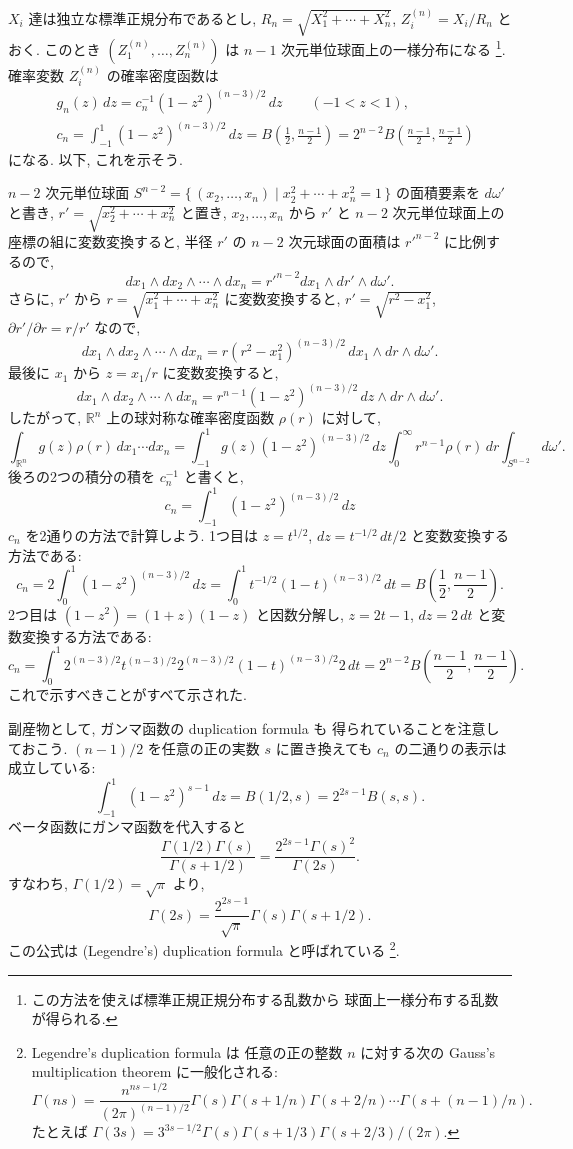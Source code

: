 \documentclass[12pt,twoside]{jarticle}
\newcommand\R{{\mathbb R}} %
\renewcommand\d{\partial}
\theoremstyle{jplain}
\theoremstyle{jplain}
\theoremstyle{jplain}
\numberwithin{theorem}{section}
\numberwithin{equation}{section}
\numberwithin{figure}{section}
\numberwithin{table}{section}
\begin{document}
$X_i$ 達は独立な標準正規分布であるとし, $R_n=\sqrt{X_1^2+\cdots+X_n^2}$,
$Z^{(n)}_i=X_i/R_n$ とおく. 
このとき $(Z^{(n)}_1,\ldots,Z^{(n)}_n)$ は $n-1$ 次元単位球面上の一様分布になる%
\footnote{この方法を使えば標準正規正規分布する乱数から
球面上一様分布する乱数が得られる.}.
確率変数 $Z^{(n)}_i$ の確率密度函数は
\begin{align*}
&
g_n(z)\,dz = c_n^{-1} (1-z^2)^{(n-3)/2}\,dz \qquad (-1<z<1),
\\ &
c_n
= \int_{-1}^1 (1-z^2)^{(n-3)/2}\,dz
= B\left( \frac{1}{2},\frac{n-1}{2} \right)
= 2^{n-2} B\left(\frac{n-1}{2},\frac{n-1}{2}\right)
\end{align*}
になる. 以下, これを示そう.

$n-2$ 次元単位球面 $S^{n-2}=\{\,(x_2,\ldots,x_n)\mid x_2^2+\cdots+x_n^2=1\,\}$ 
の面積要素を $d\omega'$ と書き, 
$r'=\sqrt{x_2^2+\cdots+x_n^2}$ と置き, 
$x_2,\ldots,x_n$ から $r'$ と $n-2$ 次元単位球面上の座標の組に変数変換すると, 
半径 $r'$ の $n-2$ 次元球面の面積は $r'^{n-2}$ に比例するので, 
\[
dx_1\wedge dx_2\wedge\cdots\wedge dx_n
=r'^{n-2}dx_1\wedge dr'\wedge d\omega'.
\]
さらに, $r'$ から $r=\sqrt{x_1^2+\cdots+x_n^2}$ に変数変換すると, 
$r'=\sqrt{r^2-x_1^2}$, $\d r'/\d r=r/r'$ なので, 
\[
dx_1\wedge dx_2\wedge\cdots\wedge dx_n
=r(r^2-x_1^2)^{(n-3)/2}\,dx_1\wedge dr\wedge d\omega'.
\]
最後に $x_1$ から $z=x_1/r$ に変数変換すると, 
\[
dx_1\wedge dx_2\wedge\cdots\wedge dx_n
=r^{n-1}(1-z^2)^{(n-3)/2}\,dz\wedge dr\wedge d\omega'.
\]
したがって, $\R^n$ 上の球対称な確率密度函数 $\rho(r)$ に対して, 
\[
\int_{\R^n} g(z)\rho(r)\,dx_1\cdots dx_n
=
\int_{-1}^1 g(z)(1-z^2)^{(n-3)/2}\,dz 
\int_0^\infty r^{n-1}\rho(r)\,dr
\int_{S^{n-2}}d\omega'.
\]
後ろの2つの積分の積を $c_n^{-1}$ と書くと,
\[
c_n=\int_{-1}^1 (1-z^2)^{(n-3)/2}\,dz
\]
$c_n$ を2通りの方法で計算しよう. 
1つ目は $z=t^{1/2}$, $dz=t^{-1/2}\,dt/2$ と変数変換する方法である:
\[
c_n
=2\int_0^1 (1-z^2)^{(n-3)/2}\,dz
=\int_0^1 t^{-1/2}(1-t)^{(n-3)/2}\,dt
=B\left(\frac{1}{2},\frac{n-1}{2}\right).
\]
2つ目は $(1-z^2)=(1+z)(1-z)$ と因数分解し, 
$z=2t-1$, $dz=2\,dt$ と変数変換する方法である:
\[
c_n
=\int_0^1 2^{(n-3)/2}t^{(n-3)/2}2^{(n-3)/2}(1-t)^{(n-3)/2}2\,dt
=2^{n-2}B\left(\frac{n-1}{2},\frac{n-1}{2}\right).
\]
これで示すべきことがすべて示された. 

副産物として, ガンマ函数の duplication formula も
得られていることを注意しておこう. 
$(n-1)/2$ を任意の正の実数 $s$ に置き換えても
$c_n$ の二通りの表示は成立している:
\[
\int_{-1}^1 (1-z^2)^{s-1}\,dz
=B(1/2,s)
=2^{2s-1}B(s,s).
\]
ベータ函数にガンマ函数を代入すると
\[
\frac{\Gamma(1/2)\Gamma(s)}{\Gamma(s+1/2)}
=\frac{2^{2s-1}\Gamma(s)^2}{\Gamma(2s)}.
\]
すなわち, $\Gamma(1/2)=\sqrt{\pi}$ より, 
\[
\Gamma(2s) = \frac{2^{2s-1}}{\sqrt{\pi}}\Gamma(s)\Gamma(s+1/2).
\]
この公式は (Legendre's) duplication formula と呼ばれている%
\footnote{Legendre's duplication formula は
任意の正の整数 $n$ に対する次の Gauss's multiplication theorem に一般化される:
\[
\Gamma(ns)=\frac{n^{ns-1/2}}{(2\pi)^{(n-1)/2}}
\Gamma(s)\Gamma(s+1/n)\Gamma(s+2/n)\cdots\Gamma(s+(n-1)/n).
\]
たとえば \(
\Gamma(3s)=3^{3s-1/2}\Gamma(s)\Gamma(s+1/3)\Gamma(s+2/3)/(2\pi)
\).
}.
\end{document}
